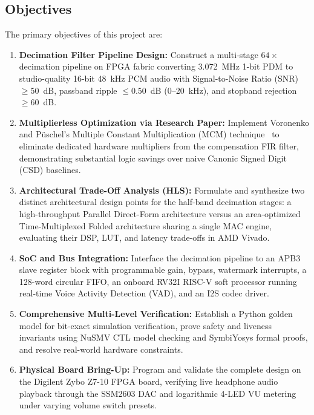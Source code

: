 \documentclass[11pt,a4paper]{article}
\begin{document}
\subsection{Objectives}
The primary objectives of this project are:
\begin{enumerate}
  \item \textbf{Decimation Filter Pipeline Design:} Construct a multi-stage $64\times$ decimation pipeline on FPGA fabric converting 3.072~MHz 1-bit PDM to studio-quality 16-bit 48~kHz PCM audio with Signal-to-Noise Ratio (SNR) $\ge 50$~dB, passband ripple $\le 0.50$~dB (0--20~kHz), and stopband rejection $\ge 60$~dB.
  \item \textbf{Multiplierless Optimization via Research Paper:} Implement Voronenko and P\"uschel's Multiple Constant Multiplication (MCM) technique~\cite{voronenko2007} to eliminate dedicated hardware multipliers from the compensation FIR filter, demonstrating substantial logic savings over naive Canonic Signed Digit (CSD) baselines.
  \item \textbf{Architectural Trade-Off Analysis (HLS):} Formulate and synthesize two distinct architectural design points for the half-band decimation stages: a high-throughput Parallel Direct-Form architecture versus an area-optimized Time-Multiplexed Folded architecture sharing a single MAC engine, evaluating their DSP, LUT, and latency trade-offs in AMD Vivado.
  \item \textbf{SoC and Bus Integration:} Interface the decimation pipeline to an APB3 slave register block with programmable gain, bypass, watermark interrupts, a 128-word circular FIFO, an onboard RV32I RISC-V soft processor running real-time Voice Activity Detection (VAD), and an I2S codec driver.
  \item \textbf{Comprehensive Multi-Level Verification:} Establish a Python golden model for bit-exact simulation verification, prove safety and liveness invariants using NuSMV CTL model checking and SymbiYosys formal proofs, and resolve real-world hardware constraints.
  \item \textbf{Physical Board Bring-Up:} Program and validate the complete design on the Digilent Zybo Z7-10 FPGA board, verifying live headphone audio playback through the SSM2603 DAC and logarithmic 4-LED VU metering under varying volume switch presets.
\end{enumerate}
\end{document}

